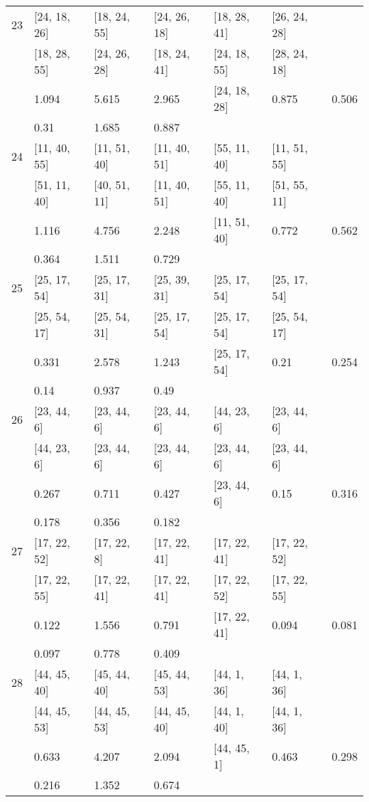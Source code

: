 \begin{longtable}{| l || l | l | l | l | l | l | }
\hline
23  & [24, 18, 26] & [18, 24, 55] & [24, 26, 18] & [18, 28, 41] & [26, 24, 28] \\
 & [18, 28, 55] & [24, 26, 28] & [18, 24, 41] & [24, 18, 55] & [28, 24, 18]\\
\hline
& 1.094 & 5.615 & 2.965 & [24, 18, 28] & 0.875 & 0.506\\
\hline
& 0.31 & 1.685 & 0.887 \\
\hline

\hline
24  & [11, 40, 55] & [11, 51, 40] & [11, 40, 51] & [55, 11, 40] & [11, 51, 55] \\
 & [51, 11, 40] & [40, 51, 11] & [11, 40, 51] & [55, 11, 40] & [51, 55, 11]\\
\hline
& 1.116 & 4.756 & 2.248 & [11, 51, 40] & 0.772 & 0.562\\
\hline
& 0.364 & 1.511 & 0.729 \\
\hline

\hline
25  & [25, 17, 54] & [25, 17, 31] & [25, 39, 31] & [25, 17, 54] & [25, 17, 54] \\
 & [25, 54, 17] & [25, 54, 31] & [25, 17, 54] & [25, 17, 54] & [25, 54, 17]\\
\hline
& 0.331 & 2.578 & 1.243 & [25, 17, 54] & 0.21 & 0.254\\
\hline
& 0.14 & 0.937 & 0.49 \\
\hline

\hline
26  & [23, 44, 6] & [23, 44, 6] & [23, 44, 6] & [44, 23, 6] & [23, 44, 6] \\
 & [44, 23, 6] & [23, 44, 6] & [23, 44, 6] & [23, 44, 6] & [23, 44, 6]\\
\hline
& 0.267 & 0.711 & 0.427 & [23, 44, 6] & 0.15 & 0.316\\
\hline
& 0.178 & 0.356 & 0.182 \\
\hline

\hline
27  & [17, 22, 52] & [17, 22, 8] & [17, 22, 41] & [17, 22, 41] & [17, 22, 52] \\
 & [17, 22, 55] & [17, 22, 41] & [17, 22, 41] & [17, 22, 52] & [17, 22, 55]\\
\hline
& 0.122 & 1.556 & 0.791 & [17, 22, 41] & 0.094 & 0.081\\
\hline
& 0.097 & 0.778 & 0.409 \\
\hline

\hline
28  & [44, 45, 40] & [45, 44, 40] & [45, 44, 53] & [44, 1, 36] & [44, 1, 36] \\
 & [44, 45, 53] & [44, 45, 53] & [44, 45, 40] & [44, 1, 40] & [44, 1, 36]\\
\hline
& 0.633 & 4.207 & 2.094 & [44, 45, 1] & 0.463 & 0.298\\
\hline
& 0.216 & 1.352 & 0.674 \\
\hline


\end{longtable}
